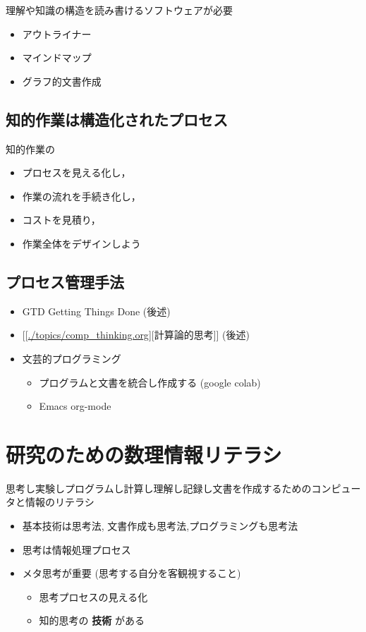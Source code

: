\documentclass[dvipdfmx,11pat]{jarticle}
\begin{document}
理解や知識の構造を読み書けるソフトウェアが必要
\begin{itemize}
\item アウトライナー
\item マインドマップ
\item グラフ的文書作成
\end{itemize}
\subsection{知的作業は構造化されたプロセス}
\label{sec:org14ee516}
知的作業の
\begin{itemize}
\item プロセスを見える化し，
\item 作業の流れを手続き化し，
\item コストを見積り，
\item 作業全体をデザインしよう
\end{itemize}
\subsection{プロセス管理手法}
\label{sec:org76d35e1}
\begin{itemize}
\item GTD Getting Things Done (後述)
\item {[}[\url{./topics/comp\_thinking.org}][計算論的思考]] (後述)

\item 文芸的プログラミング
\begin{itemize}
\item プログラムと文書を統合し作成する (google colab)
\item Emacs org-mode
\end{itemize}
\end{itemize}
\section{研究のための数理情報リテラシ}
\label{sec:org05e7f5a}

思考し実験しプログラムし計算し理解し記録し文書を作成するためのコンピュー
タと情報のリテラシ

\begin{itemize}
\item 基本技術は思考法, 文書作成も思考法,プログラミングも思考法
\item 思考は情報処理プロセス
\item メタ思考が重要 (思考する自分を客観視すること)
\begin{itemize}
\item 思考プロセスの見える化
\item 知的思考の \textbf{技術} がある
\end{itemize}
\end{itemize}
\end{document}
